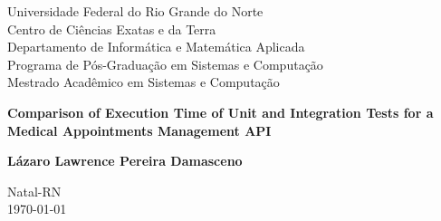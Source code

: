 \begin{center}
Universidade Federal do Rio Grande do Norte \\
Centro de Ciências Exatas e da Terra \\
Departamento de Informática e Matemática Aplicada \\
Programa de Pós-Graduação em Sistemas e Computação \\
Mestrado Acadêmico em Sistemas e Computação \\
\end{center}

\vspace*{\fill}
\begin{center}
\textbf{Comparison of Execution Time of Unit and Integration Tests for a Medical Appointments Management API}
\end{center}

\vspace*{\fill}
\begin{center}
\textbf{Lázaro Lawrence Pereira Damasceno}
\end{center}

\vspace*{\fill} 
\begin{center}
Natal-RN \\
\today
\end{center}

